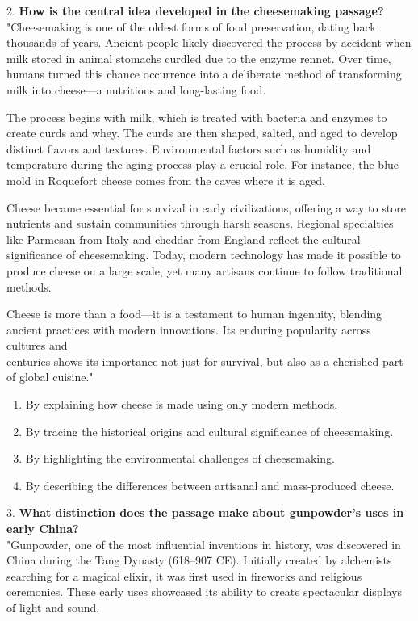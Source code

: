 \documentclass[12pt]{article}
\begin{document}
\newpage

2. \textbf{How is the central idea developed in the cheesemaking passage?}\\  
"Cheesemaking is one of the oldest forms of food preservation, dating back \\thousands of years. Ancient people likely discovered the process by accident when milk stored in animal stomachs curdled due to the enzyme rennet. Over time, humans turned this chance occurrence into a deliberate method of transforming milk into cheese—a nutritious and long-lasting food.

The process begins with milk, which is treated with bacteria and enzymes to create curds and whey. The curds are then shaped, salted, and aged to develop distinct flavors and textures. Environmental factors such as humidity and temperature during the aging process play a crucial role. For instance, the blue mold in Roquefort cheese comes from the caves where it is aged.

Cheese became essential for survival in early civilizations, offering a way to store nutrients and sustain communities through harsh seasons. Regional specialties like Parmesan from Italy and cheddar from England reflect the cultural significance of cheesemaking. Today, modern technology has made it possible to produce cheese on a large scale, yet many artisans continue to follow traditional methods.

Cheese is more than a food—it is a testament to human ingenuity, blending ancient practices with modern innovations. Its enduring popularity across cultures and \\centuries shows its importance not just for survival, but also as a cherished part of global cuisine."\\  
\begin{enumerate}[label=\Alph*.]
    \item By explaining how cheese is made using only modern methods.  
    \item By tracing the historical origins and cultural significance of cheesemaking.  
    \item By highlighting the environmental challenges of cheesemaking.  
    \item By describing the differences between artisanal and mass-produced cheese.  
\end{enumerate}

\newpage

3. \textbf{What distinction does the passage make about gunpowder’s uses in early China?}\\  
"Gunpowder, one of the most influential inventions in history, was discovered in China during the Tang Dynasty (618–907 CE). Initially created by alchemists \\searching for a magical elixir, it was first used in fireworks and religious ceremonies. These early uses showcased its ability to create spectacular displays of light and sound.
\end{document}
